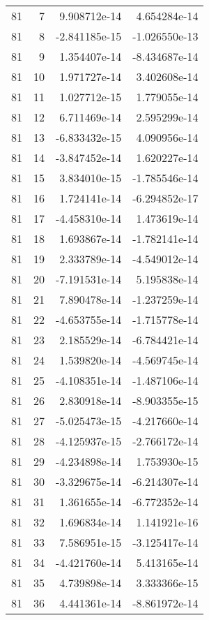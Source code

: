 \begin{tabular}{rrrr}
  81 &    7 &  9.908712e-14 &  4.654284e-14 \\
  81 &    8 & -2.841185e-15 & -1.026550e-13 \\
  81 &    9 &  1.354407e-14 & -8.434687e-14 \\
  81 &   10 &  1.971727e-14 &  3.402608e-14 \\
  81 &   11 &  1.027712e-15 &  1.779055e-14 \\
  81 &   12 &  6.711469e-14 &  2.595299e-14 \\
  81 &   13 & -6.833432e-15 &  4.090956e-14 \\
  81 &   14 & -3.847452e-14 &  1.620227e-14 \\
  81 &   15 &  3.834010e-15 & -1.785546e-14 \\
  81 &   16 &  1.724141e-14 & -6.294852e-17 \\
  81 &   17 & -4.458310e-14 &  1.473619e-14 \\
  81 &   18 &  1.693867e-14 & -1.782141e-14 \\
  81 &   19 &  2.333789e-14 & -4.549012e-14 \\
  81 &   20 & -7.191531e-14 &  5.195838e-14 \\
  81 &   21 &  7.890478e-14 & -1.237259e-14 \\
  81 &   22 & -4.653755e-14 & -1.715778e-14 \\
  81 &   23 &  2.185529e-14 & -6.784421e-14 \\
  81 &   24 &  1.539820e-14 & -4.569745e-14 \\
  81 &   25 & -4.108351e-14 & -1.487106e-14 \\
  81 &   26 &  2.830918e-14 & -8.903355e-15 \\
  81 &   27 & -5.025473e-15 & -4.217660e-14 \\
  81 &   28 & -4.125937e-15 & -2.766172e-14 \\
  81 &   29 & -4.234898e-14 &  1.753930e-15 \\
  81 &   30 & -3.329675e-14 & -6.214307e-14 \\
  81 &   31 &  1.361655e-14 & -6.772352e-14 \\
  81 &   32 &  1.696834e-14 &  1.141921e-16 \\
  81 &   33 &  7.586951e-15 & -3.125417e-14 \\
  81 &   34 & -4.421760e-14 &  5.413165e-14 \\
  81 &   35 &  4.739898e-14 &  3.333366e-15 \\
  81 &   36 &  4.441361e-14 & -8.861972e-14 \\

\end{tabular}
